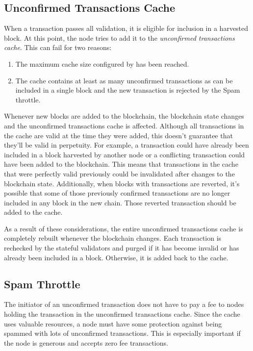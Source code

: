 \subsection{Unconfirmed Transactions Cache}

When a transaction passes all validation, it is eligible for inclusion in a harvested block.
At this point, the node tries to add it to the \textit{unconfirmed transactions cache}.
This can fail for two reasons:
\begin{enumerate}
	\item{The maximum cache size configured by  has been reached.}
	\item{The cache contains at least as many unconfirmed transactions as can be included in a single block and the new transaction is rejected by the Spam throttle}.
\end{enumerate}

Whenever new blocks are added to the blockchain, the blockchain state changes and the unconfirmed transactions cache is affected.
Although all transactions in the cache are valid at the time they were added, this doesn't guarantee that they'll be valid in perpetuity.
For example, a transaction could have already been included in a block harvested by another node or a conflicting transaction could have been added to the blockchain.
This means that transactions in the cache that were perfectly valid previously could be invalidated after changes to the blockchain state.
Additionally, when blocks with transactions are reverted, it's possible that some of those previously confirmed transactions are no longer included in any block in the new chain.
Those reverted transaction should be added to the cache.

As a result of these considerations, the entire unconfirmed transactions cache is completely rebuilt whenever the blockchain changes.
Each transaction is rechecked by the stateful validators and purged if it has become invalid or has already been included in a block.
Otherwise, it is added back to the cache.

\subsection{Spam Throttle}

The initiator of an unconfirmed transaction does not have to pay a fee to nodes holding the transaction in the unconfirmed transactions cache.
Since the cache uses valuable resources, a node must have some protection against being spammed with lots of unconfirmed transactions.
This is especially important if the node is generous and accepts zero fee transactions.

